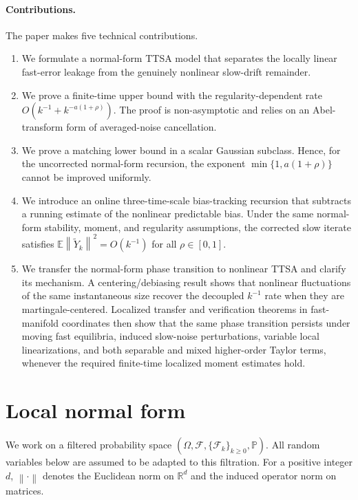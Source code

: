 \documentclass{article}
\newcommand{\R}{\mathbb{R}}
\newcommand{\E}{\mathbb{E}}
\newcommand{\norm}[1]{\left\lVert #1\right\rVert}
\begin{document}
\paragraph{Contributions.}
The paper makes five technical contributions.
\begin{enumerate}[leftmargin=*]
\item We formulate a normal-form TTSA model that separates the locally linear fast-error leakage from the genuinely nonlinear slow-drift remainder.
\item We prove a finite-time upper bound with the regularity-dependent rate $O(k^{-1}+k^{-a(1+\rho)})$. The proof is non-asymptotic and relies on an Abel-transform form of averaged-noise cancellation.
\item We prove a matching lower bound in a scalar Gaussian subclass. Hence, for the uncorrected normal-form recursion, the exponent $\min\{1,a(1+\rho)\}$ cannot be improved uniformly.
\item We introduce an online three-time-scale bias-tracking recursion that subtracts a running estimate of the nonlinear predictable bias. Under the same normal-form stability, moment, and regularity assumptions, the corrected slow iterate satisfies $\E\norm{\widetilde Y_k}^2=O(k^{-1})$ for all $\rho\in[0,1]$.
\item We transfer the normal-form phase transition to nonlinear TTSA and clarify its mechanism. A centering/debiasing result shows that nonlinear fluctuations of the same instantaneous size recover the decoupled $k^{-1}$ rate when they are martingale-centered. Localized transfer and verification theorems in fast-manifold coordinates then show that the same phase transition persists under moving fast equilibria, induced slow-noise perturbations, variable local linearizations, and both separable and mixed higher-order Taylor terms, whenever the required finite-time localized moment estimates hold.
\end{enumerate}

\section{Local normal form}

We work on a filtered probability space $(\Omega,\mathcal F,\{\mathcal F_k\}_{k\ge0},\mathbb P)$. All random variables below are assumed to be adapted to this filtration. For a positive integer $d$, $\norm{\cdot}$ denotes the Euclidean norm on $\R^d$ and the induced operator norm on matrices.
\end{document}
